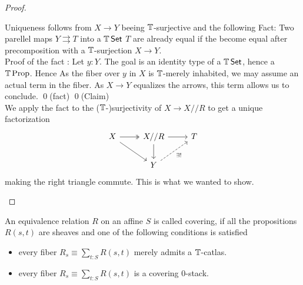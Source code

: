 \begin{proof}
\begin{itemize}
		Uniqueness follows from $X \to Y$ beeing $\mathbb{T}$-surjective and the following
		Fact: Two parellel maps $Y \rightrightarrows T$ into a $\mathbb{T} \operatorname{\mathsf {Set}}$ $T$ are already equal if the become equal after precomposition with a $\mathbb{T}$-surjection $X \to Y$.  \\
		Proof of the fact : Let $y : Y$. The goal is an identity type of a $\mathbb{T} \operatorname{\mathsf {Set}}$, hence a $\mathbb{T} \operatorname{Prop}$. Hence As the fiber over $y$ in $X$ is $\mathbb{T}$-merely inhabited, we may assume an actual term in the fiber. 	As $X \to Y$ equalizes the arrows, this term allows us to conclude. \qed (fact)	\qed(Claim) \\
		We apply the fact to the ($\mathbb{T}$-)surjectivity of $X \to X // R $ to get a unique factorization 
		\[\begin{tikzcd}
			X & {X // R} & T \\
			& Y
			\arrow[two heads, from=1-1, to=1-2]
			\arrow[from=1-1, to=2-2]
			\arrow[from=1-2, to=1-3]
			\arrow[from=1-2, to=2-2]
			\arrow["{\exists!}"', dashed, from=2-2, to=1-3]
		\end{tikzcd}\]
		making the right triangle commute. This is what we wanted to show.
	\end{itemize}
\end{proof}



	\begin{definition}{\label{def:coveringEqRel}}
		An equivalence relation $R$ on an affine $S$ is called covering, if all the propositions $R(s,t)$ are sheaves and one of the following conditions is satisfied
		
		\begin{itemize}
			\item  every fiber $R_s \equiv \sum_{t: S} R(s,t)$ merely admits a $\mathbb{T}$-catlas.
			\item  every fiber $R_s \equiv \sum_{t: S} R(s,t)$ is a covering 0-stack.
		\end{itemize}
	\end{definition}

